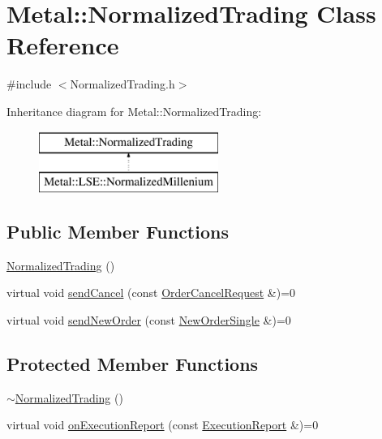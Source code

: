 \hypertarget{classMetal_1_1NormalizedTrading}{}\section{Metal\+:\+:Normalized\+Trading Class Reference}
\label{classMetal_1_1NormalizedTrading}


{\ttfamily \#include $<$Normalized\+Trading.\+h$>$}

Inheritance diagram for Metal\+:\+:Normalized\+Trading\+:\begin{figure}[H]
\begin{center}
\leavevmode
\includegraphics[height=2.000000cm]{classMetal_1_1NormalizedTrading}
\end{center}
\end{figure}
\subsection*{Public Member Functions}
\begin{DoxyCompactItemize}
\item 
\hyperlink{classMetal_1_1NormalizedTrading_ae307873f365b0d321076c8c3967a0fbd}{Normalized\+Trading} ()
\item 
virtual void \hyperlink{classMetal_1_1NormalizedTrading_afbc20b8631fdde2e55c28d3a26515ab4}{send\+Cancel} (const \hyperlink{classMetal_1_1OrderCancelRequest}{Order\+Cancel\+Request} \&)=0
\item 
virtual void \hyperlink{classMetal_1_1NormalizedTrading_a900b56c2898d265326539ece79c7931a}{send\+New\+Order} (const \hyperlink{classMetal_1_1NewOrderSingle}{New\+Order\+Single} \&)=0
\end{DoxyCompactItemize}
\subsection*{Protected Member Functions}
\begin{DoxyCompactItemize}
\item 
\hyperlink{classMetal_1_1NormalizedTrading_a6abc2cf93b45831969d3ea67bcdb2932}{$\sim$\+Normalized\+Trading} ()
\item 
virtual void \hyperlink{classMetal_1_1NormalizedTrading_a270f88ce9bc2dfd0d6e65cc7490a27ce}{on\+Execution\+Report} (const \hyperlink{namespaceMetal_af4294c176f6aecf9f75e9b106b117aa1}{Execution\+Report} \&)=0
\end{DoxyCompactItemize}


